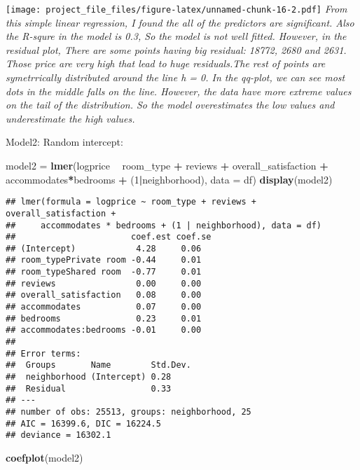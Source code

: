 \documentclass[]{article}
\newenvironment{Shaded}{\begin{snugshade}}{\end{snugshade}}
\newcommand{\KeywordTok}[1]{\textcolor[rgb]{0.13,0.29,0.53}{\textbf{#1}}}
\newcommand{\DataTypeTok}[1]{\textcolor[rgb]{0.13,0.29,0.53}{#1}}
\newcommand{\DecValTok}[1]{\textcolor[rgb]{0.00,0.00,0.81}{#1}}
\newcommand{\StringTok}[1]{\textcolor[rgb]{0.31,0.60,0.02}{#1}}
\newcommand{\OperatorTok}[1]{\textcolor[rgb]{0.81,0.36,0.00}{\textbf{#1}}}
\newcommand{\NormalTok}[1]{#1}
\begin{document}
\texttt{[image: project\_file\_files/figure-latex/unnamed-chunk-16-2.pdf]}
\emph{From this simple linear regression, I found the all of the
predictors are significant. Also the R-squre in the model is 0.3, So the
model is not well fitted. However, in the residual plot, There are some
points having big residual: 18772, 2680 and 2631. Those price are very
high that lead to huge residuals.The rest of points are symetrrically
distributed around the line h = 0. In the qq-plot, we can see most dots
in the middle falls on the line. However, the data have more extreme
values on the tail of the distribution. So the model overestimates the
low values and underestimate the high values.}

Model2: Random intercept:

\begin{Shaded}
\begin{Highlighting}[]
\NormalTok{model2 =}\StringTok{ }\KeywordTok{lmer}\NormalTok{(logprice }\OperatorTok{~}\StringTok{ }\NormalTok{room_type }\OperatorTok{+}\StringTok{ }\NormalTok{reviews }\OperatorTok{+}\StringTok{ }\NormalTok{overall_satisfaction }\OperatorTok{+}\StringTok{ }\NormalTok{accommodates}\OperatorTok{*}\NormalTok{bedrooms }\OperatorTok{+}\StringTok{ }\NormalTok{(}\DecValTok{1}\OperatorTok{|}\NormalTok{neighborhood), }\DataTypeTok{data =}\NormalTok{ df)}
\KeywordTok{display}\NormalTok{(model2)}
\end{Highlighting}
\end{Shaded}

\begin{verbatim}
## lmer(formula = logprice ~ room_type + reviews + overall_satisfaction + 
##     accommodates * bedrooms + (1 | neighborhood), data = df)
##                       coef.est coef.se
## (Intercept)            4.28     0.06  
## room_typePrivate room -0.44     0.01  
## room_typeShared room  -0.77     0.01  
## reviews                0.00     0.00  
## overall_satisfaction   0.08     0.00  
## accommodates           0.07     0.00  
## bedrooms               0.23     0.01  
## accommodates:bedrooms -0.01     0.00  
## 
## Error terms:
##  Groups       Name        Std.Dev.
##  neighborhood (Intercept) 0.28    
##  Residual                 0.33    
## ---
## number of obs: 25513, groups: neighborhood, 25
## AIC = 16399.6, DIC = 16224.5
## deviance = 16302.1
\end{verbatim}

\begin{Shaded}
\begin{Highlighting}[]
\KeywordTok{coefplot}\NormalTok{(model2)}
\end{Highlighting}
\end{Shaded}
\end{document}
